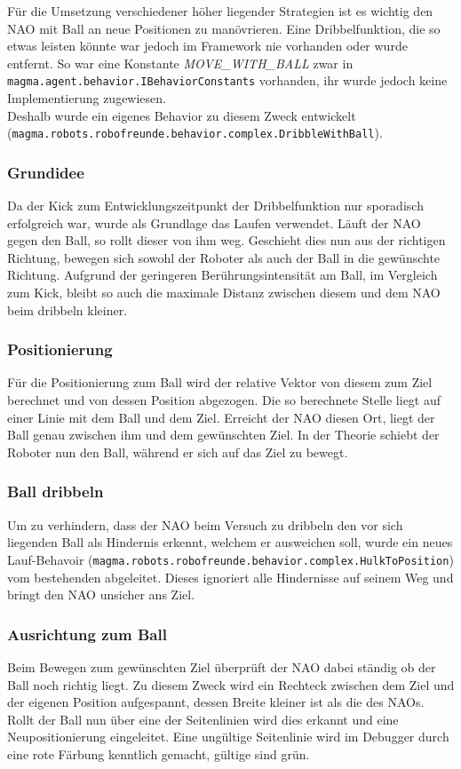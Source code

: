 Für die Umsetzung verschiedener höher liegender Strategien ist es wichtig den NAO mit Ball an neue Positionen zu manövrieren. Eine Dribbelfunktion, die so etwas leisten könnte war jedoch im Framework nie vorhanden oder wurde entfernt. So war eine Konstante \textit{MOVE\_WITH\_BALL} zwar in \texttt{magma.agent.behavior.IBehaviorConstants} vorhanden, ihr wurde jedoch keine Implementierung zugewiesen.\\
Deshalb wurde ein eigenes Behavior zu diesem Zweck entwickelt\\
(\texttt{magma.robots.robofreunde.behavior.complex.DribbleWithBall}).

\subsubsection{Grundidee}
Da der Kick zum Entwicklungszeitpunkt der Dribbelfunktion nur sporadisch erfolgreich war, wurde als Grundlage das Laufen verwendet. Läuft der NAO gegen den Ball, so rollt dieser von ihm weg. Geschieht dies nun aus der richtigen Richtung, bewegen sich sowohl der Roboter als auch der Ball in die gewünschte Richtung. Aufgrund der geringeren Berührungsintensität am Ball, im Vergleich zum Kick, bleibt so auch die maximale Distanz zwischen diesem und dem NAO beim dribbeln kleiner.

\subsubsection{Positionierung}
Für die Positionierung zum Ball wird der relative Vektor von diesem zum Ziel berechnet und von dessen Position abgezogen. Die so berechnete Stelle liegt auf einer Linie mit dem Ball und dem Ziel. Erreicht der NAO diesen Ort, liegt der Ball genau zwischen ihm und dem gewünschten Ziel. In der Theorie schiebt der Roboter nun den Ball, während er sich auf das Ziel zu bewegt.

\subsubsection{Ball dribbeln}
Um zu verhindern, dass der NAO beim Versuch zu dribbeln den vor sich liegenden Ball als Hindernis erkennt, welchem er ausweichen soll, wurde ein neues Lauf-Behavoir (\texttt{magma.robots.robofreunde.behavior.complex.HulkToPosition}) vom bestehenden abgeleitet. Dieses ignoriert alle Hindernisse auf seinem Weg und bringt den NAO unsicher ans Ziel.

\subsubsection{Ausrichtung zum Ball}
Beim Bewegen zum gewünschten Ziel überprüft der NAO dabei ständig ob der Ball noch richtig liegt. Zu diesem Zweck wird ein Rechteck zwischen dem Ziel und der eigenen Position aufgespannt, dessen Breite kleiner ist als die des NAOs. Rollt der Ball nun über eine der Seitenlinien wird dies erkannt und eine Neupositionierung eingeleitet. Eine ungültige Seitenlinie wird im Debugger durch eine rote Färbung kenntlich gemacht, gültige sind grün.


